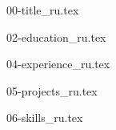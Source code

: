 \documentclass[letterpaper,11pt]{article}
\begin{document}

{00-title_ru.tex}


{02-education_ru.tex}


{04-experience_ru.tex}


{05-projects_ru.tex}


{06-skills_ru.tex}



\vfill
{}
\end{document}

